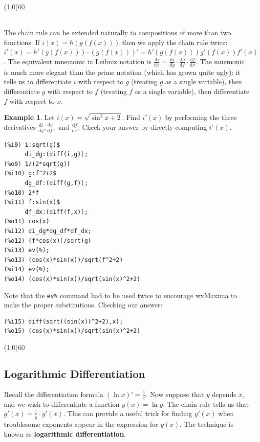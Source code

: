 \documentclass[10.5pt,twoside]{report}
\theoremstyle{definition}
\newtheorem{exmp}{Example}[section]
\begin{document}
\line(1,0){60}
\linethickness{0.5mm}

${}$\\

The chain rule can be extended naturally to compositions of more than two functions.  If $i(x)=h(g(f(x)))$ then we apply the chain rule twice: $i'(x)=h'(g(f(x)))\cdot(g(f(x)))'= h'(g(f(x)))g'(f(x))f'(x)$.  The equivalent mnemonic in Leibniz notation is $\frac{\mathrm{d} i}{\mathrm{d} x} = \frac{\mathrm{d} i}{\mathrm{d}g} \cdot \frac{\mathrm{d}g}{\mathrm{d}f} \cdot \frac{\mathrm{d}f}{\mathrm{d}x} $.  The mnemonic is much more elegant than the prime notation (which has grown quite ugly):  it tells us to differentiate $i$ with respect to $g$ (treating $g$ as a single variable), then differentiate $g$ with respect to $f$ (treating $f$ as a single variable), then differentiate $f$ with respect to $x$. 

\begin{exmp}  Let $i(x)=\sqrt{\sin^2{x}+2}$.  Find $i'(x)$ by performing the three derivatives $\frac{\mathrm{d} i}{\mathrm{d}g}, \frac{\mathrm{d}g}{\mathrm{d}f}, \text{ and } \frac{\mathrm{d}f}{\mathrm{d}x}$.  Check your answer by directly computing $i'(x)$.\\

\begin{verbatim}
(%i9) i:sqrt(g)$
      di_dg:(diff(i,g));
(%o9) 1/(2*sqrt(g))
(%i10) g:f^2+2$
      dg_df:(diff(g,f));
(%o10) 2*f
(%i11) f:sin(x)$
      df_dx:(diff(f,x));
(%o11) cos(x)
(%i12) di_dg*dg_df*df_dx;
(%o12) (f*cos(x))/sqrt(g)
(%i13) ev(%);
(%o13) (cos(x)*sin(x))/sqrt(f^2+2)
(%i14) ev(%);
(%o14) (cos(x)*sin(x))/sqrt(sin(x)^2+2)
\end{verbatim}

Note that the \verb|ev%| command had to be used twice to encourage wxMaxima to make the proper substitutions.  Checking our answer:

\begin{verbatim}
(%i15) diff(sqrt((sin(x))^2+2),x);
(%o15) (cos(x)*sin(x))/sqrt(sin(x)^2+2)
\end{verbatim}
\end{exmp}

\line(1,0){60}
\linethickness{0.5mm}

\subsection{Logarithmic Differentiation}

Recall the differentiation formula $(\ln{x})'=\frac{1}{x}$.  Now suppose that $y$ depends $x$, and we wish to differentiate a function $g(x)=\ln{y}$.  The chain rule tells us that $g'(x)=\frac{1}{y}\cdot y'(x)$.  This can provide a useful trick for finding $y'(x)$ when troublesome exponents appear in the expression for $y(x)$.  The technique is known as \textbf{logarithmic differentiation}.
\end{document}
